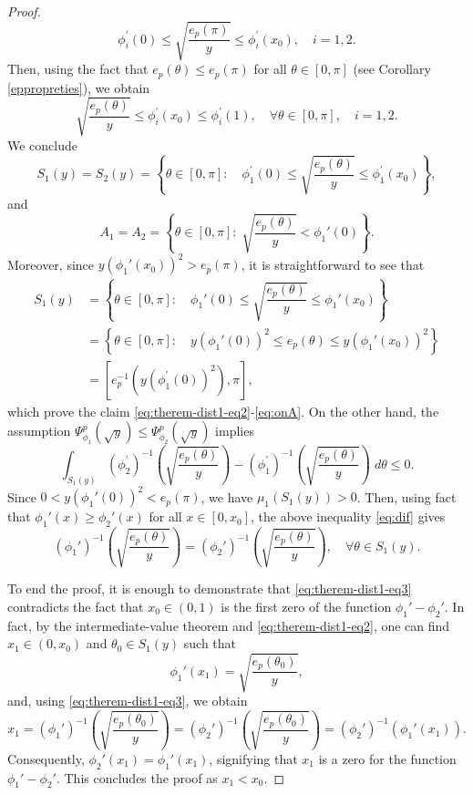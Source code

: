 \documentclass[11pt]{article}
\begin{document}
\begin{proof}
$$\phi_i^{'}(0)\leq \sqrt{\frac{e_p(\pi)}{y}}\leq \phi_i^{'}(x_0),\quad i=1,2.$$
Then, using the fact that $e_p(\theta)\leq e_p(\pi)$ for all $\theta\in[0,\pi]$ (see Corollary \ref{eppropreties}), we obtain
$$\sqrt{\frac{e_p(\theta)}{y}}\leq \phi_i^{'}(x_0)\leq \phi_i^{'}(1),\quad \forall \theta\in[0,\pi],\quad i=1,2.$$
We conclude 
$$
S_1(y) = S_2(y) = \left\{ \theta\in[0,\pi]:\quad  \phi_1^{'}(0)\leq \sqrt{\dfrac{e_p(\theta)}{y}} \leq\phi_1^{'}(x_0) \right\},
$$
and 
$$
A_1=A_2=\left\{ \theta\in[0,\pi]:\;    \sqrt{\dfrac{e_p(\theta)}{y}}< \phi_1'(0)   \right\}.
$$
Moreover, since $y(\phi_1'(x_0))^2 > e_p(\pi)$, it is straightforward to see that
\begin{align*}
S_1(y) & = \left\{ \theta\in [0,\pi]: \quad  \phi_1'(0) \leq \sqrt{\dfrac{e_p(\theta)}{y}} \leq\phi_1'(x_0) \right\}\\
& = \left\{ \theta\in [0,\pi]: \quad y\left( \phi_1'(0)   \right)^2 \leq e_p(\theta) \leq y\left( \phi_1'(x_0)   \right)^2 \right\}\\
& = \left[    e_p^{-1}\left( y\left( \phi_1^{'}(0)   \right)^2 \right),\pi   \right],
\end{align*} 
which prove the claim \eqref{eq:therem-dist1-eq2}-\eqref{eq:onA}. On the other hand, the assumption $\Psi_{\phi_1}^{p}(\sqrt{y})\leq \Psi_{\phi_2}^{p}(\sqrt{y})$ implies 
\begin{equation}\label{eq:dif}  \displaystyle\int_{S_1(y)}\left(\phi_2^{'}\right)^{-1}\left(\sqrt{\dfrac{e_p(\theta)}{y}} \right)-\left(\phi_1^{'}\right)^{-1}\left(\sqrt{\dfrac{e_p(\theta)}{y}} \right)\;d\theta\leq 0. 
\end{equation}
Since $0 < y(\phi_1'(0))^2 < e_p(\pi)$, we have $\mu_1\left(S_1(y)\right)>0$. Then, using fact that $\phi_1'(x) \geq \phi_2'(x)$ for all $x \in [0, x_0]$, the above inequality \eqref{eq:dif} gives
\begin{equation}\label{eq:therem-dist1-eq3}
\left(\phi_1'\right)^{-1}\left(\sqrt{\dfrac{e_p(\theta)}{y}} \right) =\left(\phi_2'\right)^{-1}\left(\sqrt{\dfrac{e_p(\theta)}{y}} \right), \quad \forall \theta \in S_1(y).
\end{equation}

To end the proof, it is enough to demonstrate that \eqref{eq:therem-dist1-eq3} contradicts the fact that $x_0 \in (0,1)$ is the first zero of the function $\phi_1'-\phi_2'$. In fact, by the intermediate-value theorem and  \eqref{eq:therem-dist1-eq2}, one can find $x_1 \in (0,x_0)$ and $\theta_0 \in S_1(y)$ such that
$$
\phi_1'(x_1) = \sqrt{\frac{e_p(\theta_0)}{y}},
$$
and, using \eqref{eq:therem-dist1-eq3}, we obtain 
$$
x_1=\left(\phi_1'\right)^{-1}\left( \sqrt{\frac{e_p(\theta_0)}{y}}\right) = \left(\phi_2'\right)^{-1}\left( \sqrt{\frac{e_p(\theta_0)}{y}}\right) = \left(\phi_2'\right)^{-1}\left(\phi_1'(x_1)\right).
$$
Consequently, $\phi_2'(x_1) = \phi_1'(x_1)$, signifying that $x_1$ is a zero for the function $\phi_1'-\phi_2'$. This concludes the proof as $x_1<x_0$.
\end{proof}
\end{document}
